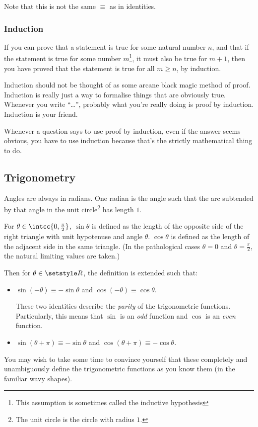 Note that this is not the same \(\equiv\) as in identities.

\subsubsection{Induction}

If you can prove that a statement is true for some natural number \(n\), and
that if the statement is true for some number \(m\)\footnote{
 This assumption is sometimes called the inductive hypothesis
}, it must also be true for
\(m + 1\), then you have proved that the statement is true for all \(m \ge n\),
by induction.

Induction should not be thought of as some arcane black magic method of proof.
Induction is really just a way to formalise things that are obviously true.
Whenever you write ``\ldots'', probably what you're really doing is proof by
induction. Induction is your friend.

Whenever a question says to use proof by induction, even if the answer seems
obvious, you have to use induction because that's the strictly mathematical
thing to do.

\subsection{Trigonometry}

Angles are always in radians. One radian is the angle such that the arc
subtended by that angle in the unit circle\footnote{
 The unit circle is the circle with radius \(1\).
} has length \(1\).

For \(\theta \in \intcc{0, \frac \pi 2}\), \(\sin \theta\) is defined as the
length of the opposite side of the right triangle with unit hypotenuse and angle
\(\theta\). \(\cos \theta\) is defined as the length of the adjacent side in the
same triangle. (In the pathological cases \(\theta = 0\) and
\(\theta = \frac \pi 2\), the natural limiting values are taken.)

Then for \(\theta \in \Reals\), the definition is extended such that:
\begin{itemize}
 \item
  \(\sin(-\theta) \equiv -\sin \theta\) and
  \(\cos(-\theta) \equiv \cos \theta\).

  These two identities describe the \emph{parity} of the trigonometric
  functions. Particularly, this means that \(\sin\) is an \emph{odd} function
  and \(\cos\) is an \emph{even} function.
 \item
  \(\sin(\theta + \pi) \equiv -\sin \theta\) and
  \(\cos(\theta + \pi) \equiv -\cos \theta\).
\end{itemize}
You may wish to take some time to convince yourself that these completely and
unambiguously define the trigonometric functions as you know them (in the
familiar wavy shapes).

